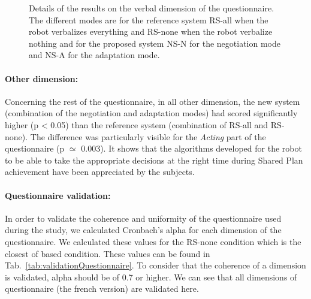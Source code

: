 \documentclass[english,a4paper,11pt,twoside]{StyleThese}
\begin{document}
\begin{figure}[!h]
\centering
    \caption{Details of the results on the verbal dimension of the questionnaire. The different modes are for the reference system RS-all when the robot verbalizes everything and RS-none when the robot verbalize nothing and for the proposed system NS-N for the negotiation mode and NS-A for the adaptation mode.}
    \label{fig:resUS}
\end{figure}


\paragraph{Other dimension:}
Concerning the rest of the questionnaire, in all other dimension, the new system (combination of the negotiation and adaptation modes) had scored significantly higher (p < 0.05) than the reference system (combination of RS-all and RS-none). The difference was particularly visible for the \textit{Acting} part of the questionnaire (p $\simeq$ 0.003). It shows that the algorithms developed for the robot to be able to take the appropriate decisions at the right time during Shared Plan achievement have been appreciated by the subjects.

\paragraph{Questionnaire validation:}
In order to validate the coherence and uniformity of the questionnaire used during the study, we calculated Cronbach's alpha for each dimension of the questionnaire. We calculated these values for the RS-none condition which is the closest of based condition. These values can be found in Tab.~\ref{tab:validationQuestionnaire}. To consider that the coherence of a dimension is validated, alpha should be of 0.7 or higher. We can see that all dimensions of questionnaire (the french version) are validated here. 
\end{document}
